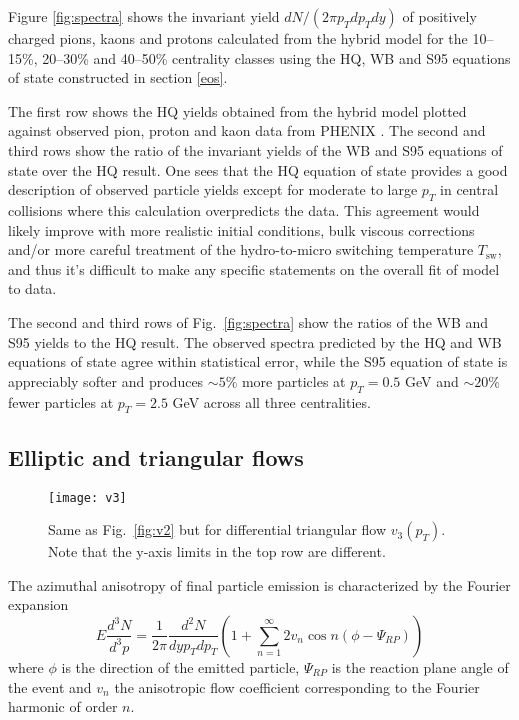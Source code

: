 \documentclass[aps,prc,reprint,amsmath,nofootinbib,superscriptaddress]{revtex4-1}
\begin{document}
Figure \ref{fig:spectra} shows the invariant yield $dN/(2\pi p_T dp_T dy)$ of positively charged pions, kaons and protons calculated from the hybrid model for the 10--15\%, 20--30\%
and 40--50\% centrality classes using the HQ, WB and S95 equations of state constructed in section \ref{eos}. 

The first row shows the HQ yields obtained from the hybrid model plotted against observed pion, proton and kaon data from PHENIX \cite{Adler:2003cb}. The second and third rows show the ratio of the invariant yields of the WB and S95 equations of state over the HQ result. One sees that the HQ equation of state provides a good description of observed particle yields except for moderate to large $p_T$ in central collisions where this calculation overpredicts the data. This agreement would likely improve with more realistic initial conditions, bulk viscous corrections and/or more careful treatment of the hydro-to-micro switching temperature $T_\text{sw}$, and thus it's difficult to make any specific statements on the overall fit of model to data. 

The second and third rows of Fig.~\ref{fig:spectra} show the ratios of the WB and S95 yields to the HQ result. The observed spectra predicted by the HQ and WB equations of state agree within statistical error, while the S95 equation of state is appreciably softer and produces $\sim\!5\%$ more particles at $p_T = 0.5$ GeV and $\sim\!20\%$ fewer particles at $p_T=2.5$ GeV across all three centralities.

\vfill

\subsection{Elliptic and triangular flows}
\label{flow}

\begin{figure*}[t]
  \texttt{[image: v3]}
  \caption{
    \label{fig:v3} Same as Fig.~\ref{fig:v2} but for differential triangular flow $v_3(p_T)$. Note that the y-axis limits in the top row are different.
  }
\end{figure*}

The azimuthal anisotropy of final particle emission is characterized by the Fourier expansion
\begin{equation}
 E \frac{d^3N}{d^3p} = \frac{1}{2\pi} \frac{d^2N}{dy p_T dp_T} \left(1 + \sum\limits_{n=1}^\infty 2 v_n \cos n(\phi - \Psi_{RP}) \right)
\end{equation}
where $\phi$ is the direction of the emitted particle, $\Psi_{RP}$ is the reaction plane angle of the event and $v_n$ the anisotropic flow coefficient corresponding to the Fourier harmonic of order $n$.
\end{document}
